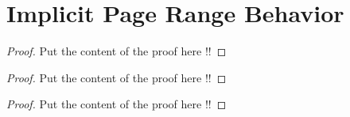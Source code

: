 \documentclass{article}
\begin{document}
	
	\pagebreak
	
	\section{Implicit Page Range Behavior}
	\begin{proof}
		Put the content of the proof here !!
	\end{proof}
	
	\pagebreak
	
	\begin{proof}
		Put the content of the proof here !!
	\end{proof}
	
	\pagebreak
	
	\begin{proof}
		Put the content of the proof here !!
	\end{proof}
	
	\printindex
	
\end{document}

